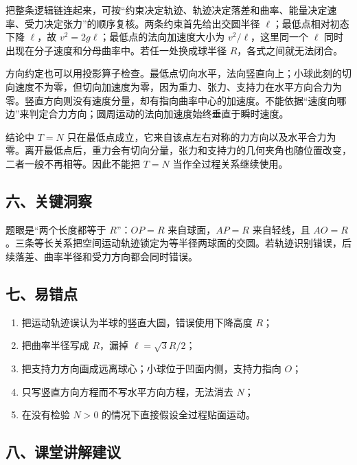 \documentclass[12pt,a4paper,UTF8]{ctexart}
\newcommand{\tightlist}{\setlength{\itemsep}{0pt}\setlength{\parskip}{0pt}}
\begin{document}
把整条逻辑链连起来，可按``约束决定轨迹、轨迹决定落差和曲率、能量决定速率、受力决定张力''的顺序复核。两条约束首先给出交圆半径
\(\ell\)；最低点相对初态下降 \(\ell\)，故
\(v^2=2g\ell\)；最低点的法向加速度大小为 \(v^2/\ell\)，这里同一个
\(\ell\) 同时出现在分子速度和分母曲率中。若任一处换成球半径
\(R\)，各式之间就无法闭合。

方向约定也可以用投影算子检查。最低点切向水平，法向竖直向上；小球此刻的切向速度不为零，但切向加速度为零，因为重力、张力、支持力在水平方向合力为零。竖直方向则没有速度分量，却有指向曲率中心的加速度。不能依据``速度向哪边''来判定合力方向；圆周运动的法向加速度始终垂直于瞬时速度。

结论中 \(T=N\)
只在最低点成立，它来自该点左右对称的力方向以及水平合力为零。离开最低点后，重力会有切向分量，张力和支持力的几何夹角也随位置改变，二者一般不再相等。因此不能把
\(T=N\) 当作全过程关系继续使用。

\subsection{六、关键洞察}\label{ux516dux5173ux952eux6d1eux5bdf}

题眼是``两个长度都等于 \(R\)''：\(OP=R\) 来自球面，\(AP=R\) 来自轻线，且
\(AO=R\)。三条等长关系把空间运动轨迹锁定为等半径两球面的交圆。若轨迹识别错误，后续落差、曲率半径和受力方向都会同时错误。

\subsection{七、易错点}\label{ux4e03ux6613ux9519ux70b9}

\begin{enumerate}
\def\labelenumi{\arabic{enumi}.}
\tightlist
\item
  把运动轨迹误认为半球的竖直大圆，错误使用下降高度 \(R\)；
\item
  把曲率半径写成 \(R\)，漏掉 \(\ell=\sqrt3R/2\)；
\item
  把支持力方向画成远离球心；小球位于凹面内侧，支持力指向 \(O\)；
\item
  只写竖直方向方程而不写水平方向方程，无法消去 \(N\)；
\item
  在没有检验 \(N>0\) 的情况下直接假设全过程贴面运动。
\end{enumerate}

\subsection{八、课堂讲解建议}\label{ux516bux8bfeux5802ux8bb2ux89e3ux5efaux8bae}
\end{document}
